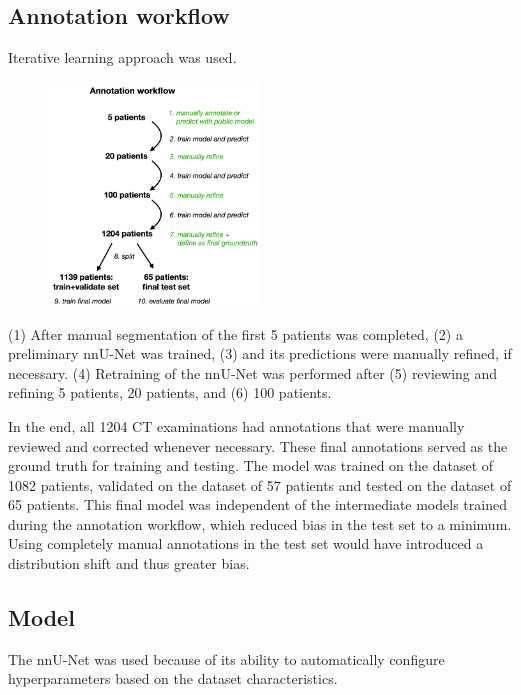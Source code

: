 \documentclass[11pt]{article}
\begin{document}
\subsection{Annotation workflow}

Iterative learning approach was used.

\begin{figure}
    \centering
    \includegraphics*[width=0.5\textwidth]{images/AnnotationWorkflow.png}
\end{figure}

(1) After manual segmentation of the first 5 patients was completed, (2) a preliminary nnU-Net was trained, (3) and its predictions were manually refined, if necessary. (4) Retraining of the nnU-Net was performed after (5) reviewing and refining 5 patients, 20 patients, and (6) 100 patients.

In the end, all 1204 CT examinations had annotations that were manually reviewed and corrected whenever necessary. These final annotations served as the ground truth for training and testing. The model was trained on the dataset of 1082 patients, validated on the dataset of 57 patients and tested on the dataset of 65 patients. This final model was independent of the intermediate models trained during the annotation workflow, which reduced bias in the test set to a minimum. Using completely manual annotations in the test set would have introduced a distribution shift and thus greater bias.

\subsection{Model}

The nnU-Net was used because of its ability to automatically configure hyperparameters based on the dataset characteristics.
\end{document}
